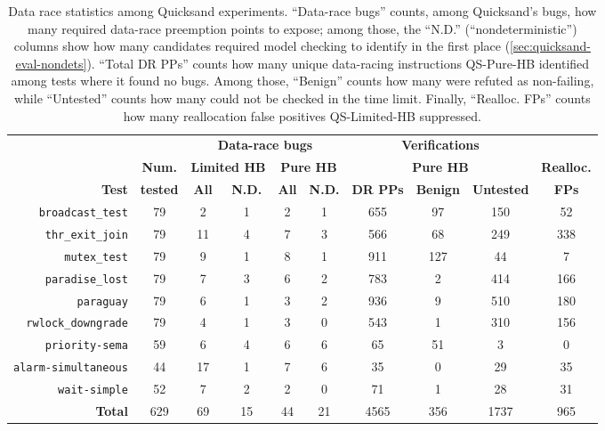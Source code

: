 \begin{table}[t]
	\begin{center}
	\footnotesize
	\begin{tabular}{r|c||c|c|c|c||c|c|c||c}
		\multicolumn{2}{c||}{} & \multicolumn{4}{c||}{\bf {Data-race bugs}}
		& \multicolumn{3}{c||}{\bf {Verifications}} \\
		& {\bf Num.}
		& \multicolumn{2}{c|}{\bf {Limited HB}}
		& \multicolumn{2}{c||}{\bf {Pure HB}}
		& \multicolumn{3}{c||}{\bf {Pure HB}}
		& \multicolumn{1}{c}{\bf {Realloc.}}
		\\
		{\bf Test} & {\bf tested}
		& {\bf All} & {\bf N.D.} & {\bf {All}} & {\bf {N.D.}}
		& {\bf DR PPs} & {\bf Benign} & {\bf Untested} & {\bf FPs} \\
		\hline
		{\tt broadcast\_test}    & 79  & 2 & 1 & {2} & {1} & 655  & 97  & 150 & 52  \\
		{\tt thr\_exit\_join}    & 79  & 11& 4 & {7} & {3} & 566  & 68  & 249 & 338 \\
		{\tt mutex\_test}        & 79  & 9 & 1 & {8} & {1} & 911  & 127 & 44  & 7   \\
		{\tt paradise\_lost}     & 79  & 7 & 3 & {6} & {2} & 783  & 2   & 414 & 166 \\
		{\tt paraguay}           & 79  & 6 & 1 & {3} & {2} & 936  & 9   & 510 & 180 \\
		{\tt rwlock\_downgrade}  & 79  & 4 & 1 & {3} & {0} & 543  & 1   & 310 & 156 \\
		\hline
		{\tt priority-sema}      & 59  & 6 & 4 & {6} & {6} & 65   & 51  & 3   & 0   \\
		{\tt alarm-simultaneous} & 44  & 17& 1 & {7} & {6} & 35   & 0   & 29  & 35  \\
		{\tt wait-simple}        & 52  & 7 & 2 & {2} & {0} & 71   & 1   & 28  & 31  \\
		\hline
		{\bf Total}              & 629 & 69& 15& {44}& {21}& 4565 & 356 & 1737& 965 \\
	\end{tabular}
	\end{center}
	\caption[Data race statistics among Quicksand experiments.]
	{Data race statistics among Quicksand experiments.
	``Data-race bugs'' counts, among Quicksand's bugs, how many required data-race preemption points to expose;
	among those, the ``N.D.'' (``nondeterministic'') columns show how many candidates
	required model checking to identify
	in the first place
	(\cref{sec:quicksand-eval-nondets}).
	``Total DR PPs'' counts how many unique data-racing instructions
	QS-Pure-HB identified among tests where it found no bugs.
	Among those, ``Benign'' counts how many were refuted as non-failing,
	while ``Untested'' counts how many could not be checked in the time limit.
	Finally, ``Realloc. FPs'' counts how many reallocation false positives QS-Limited-HB suppressed.
	}
	\label{tab:drstatistix}
\end{table}

